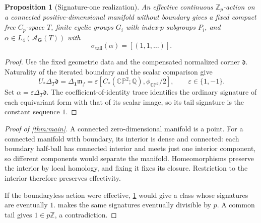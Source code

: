 \documentclass[11pt]{amsart}
\numberwithin{equation}{section}
\newtheorem{proposition}[proposition]{Proposition}
\theoremstyle{definition}
\theoremstyle{remark}
\newcommand{\Q}{\mathbb Q}
\newcommand{\Z}{\mathbb Z}
\newcommand{\CP}{\mathbb {CP}}
\newcommand{\Zp}{\mathbb Z_p}
\begin{document}
\begin{proposition}[Signature-one realization]\label{prop:signature-one}
An effective continuous $\Zp$-action on a connected positive-dimensional
manifold without boundary gives a fixed compact free $C_p$-space $T$,
finite cyclic groups $G_i$ with index-$p$ subgroups $P_i$, and
$\alpha\in L_4(\mathcal A_{\mathbf G}(T))$ with
\begin{equation}\label{eq:signature-one}
 \sigma_{\mathrm{tail}}(\alpha)=[(1,1,\ldots)].
\end{equation}
\end{proposition}
\begin{proof}
Use the fixed geometric data and the compensated normalized corner
$\mathfrak d$. Naturality of the iterated boundary and the scalar
comparison give
\[
 U_*\Delta_T\mathfrak d=\Delta_{\mathbf1}\mathfrak m_f
   =\varepsilon[C_*(\CP^2;\Q),\phi_{\CP^2}/2],
 \qquad \varepsilon\in\{1,-1\}.
\]
Set $\alpha=\varepsilon\Delta_T\mathfrak d$.
The coefficient-of-identity trace identifies the ordinary signature
of each equivariant form with that of its scalar image, so its tail
signature is the constant sequence $1$.
\end{proof}

\begin{proof}[Proof of \cref{thm:main}]
A connected zero-dimensional manifold is a point. For a connected
manifold with boundary, its interior is dense and connected:
each boundary half-ball has connected interior and meets just one
interior component, so different components would separate the manifold.
Homeomorphisms preserve the interior by local homology, and fixing it
fixes its closure.
Restriction to the interior therefore preserves effectivity.

If the boundaryless action were effective, \cref{prop:signature-one}
would give a class whose signatures are eventually $1$.
 makes the same signatures eventually divisible
by $p$. A common tail gives $1\in p\Z$, a contradiction.
\end{proof}
\end{document}
